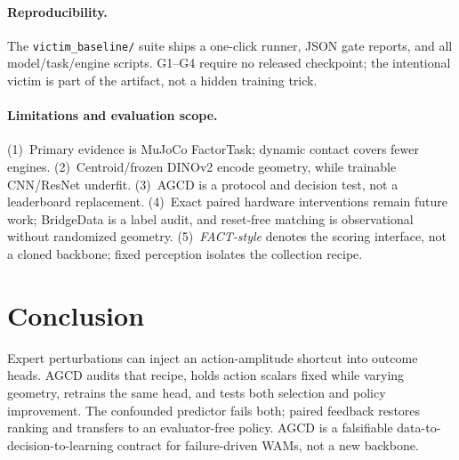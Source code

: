 \documentclass[conference]{IEEEtran}
\begin{document}
\paragraph{Reproducibility.}
The \texttt{victim\_baseline/} suite ships a one-click runner, JSON gate reports,
and all model/task/engine scripts. G1--G4 require no released checkpoint; the
intentional victim is part of the artifact, not a hidden training trick.

\paragraph{Limitations and evaluation scope.}
(1)~Primary evidence is MuJoCo FactorTask; dynamic contact covers fewer engines.
(2)~Centroid/frozen DINOv2 encode geometry, while trainable CNN/ResNet underfit.
(3)~AGCD is a protocol and decision test, not a leaderboard replacement.
(4)~Exact paired hardware interventions remain future work; BridgeData is a
label audit, and reset-free matching is observational without randomized geometry.
(5)~\emph{FACT-style} denotes the scoring interface, not a cloned backbone;
fixed perception isolates the collection recipe.

\section{Conclusion}
\label{sec:conclusion}

Expert perturbations can inject an action-amplitude shortcut into outcome heads.
AGCD audits that recipe, holds action scalars fixed while varying geometry,
retrains the same head, and tests both selection and policy improvement. The
confounded predictor fails both; paired feedback restores ranking and transfers
to an evaluator-free policy. AGCD is a falsifiable data-to-decision-to-learning
contract for failure-driven WAMs, not a new backbone.
\end{document}
